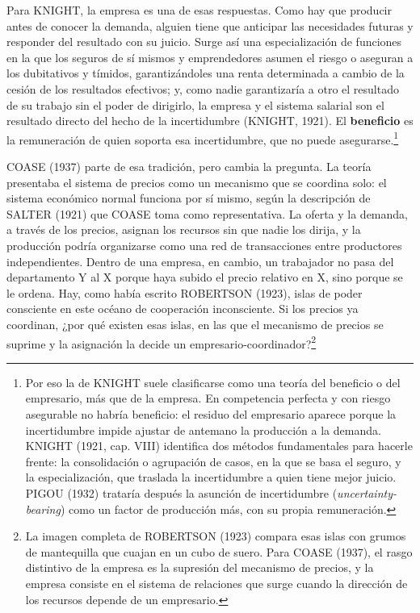 \documentclass[10pt,a4paper]{article}
\begin{document}
Para KNIGHT, la empresa es una de esas respuestas. Como hay que producir antes de conocer la demanda, alguien tiene que anticipar las necesidades futuras y responder del resultado con su juicio. Surge así una especialización de funciones en la que los seguros de sí mismos y emprendedores asumen el riesgo o aseguran a los dubitativos y tímidos, garantizándoles una renta determinada a cambio de la cesión de los resultados efectivos; y, como nadie garantizaría a otro el resultado de su trabajo sin el poder de dirigirlo, la empresa y el sistema salarial son el resultado directo del hecho de la incertidumbre (KNIGHT, 1921). El \textbf{beneficio} es la remuneración de quien soporta esa incertidumbre, que no puede asegurarse.\footnote{%
    Por eso la de KNIGHT suele clasificarse como una teoría del beneficio o del empresario, más que de la empresa. En competencia perfecta y con riesgo asegurable no habría beneficio: el residuo del empresario aparece porque la incertidumbre impide ajustar de antemano la producción a la demanda. KNIGHT (1921, cap. VIII) identifica dos métodos fundamentales para hacerle frente: la consolidación o agrupación de casos, en la que se basa el seguro, y la especialización, que traslada la incertidumbre a quien tiene mejor juicio. PIGOU (1932) trataría después la asunción de incertidumbre (\textit{uncertainty-bearing}) como un factor de producción más, con su propia remuneración.
}

COASE (1937) parte de esa tradición, pero cambia la pregunta. La teoría presentaba el sistema de precios como un mecanismo que se coordina solo: el sistema económico normal funciona por sí mismo, según la descripción de SALTER (1921) que COASE toma como representativa. La oferta y la demanda, a través de los precios, asignan los recursos sin que nadie los dirija, y la producción podría organizarse como una red de transacciones entre productores independientes. Dentro de una empresa, en cambio, un trabajador no pasa del departamento Y al X porque haya subido el precio relativo en X, sino porque se le ordena. Hay, como había escrito ROBERTSON (1923), islas de poder consciente en este océano de cooperación inconsciente. Si los precios ya coordinan, ¿por qué existen esas islas, en las que el mecanismo de precios se suprime y la asignación la decide un empresario-coordinador?\footnote{%
    La imagen completa de ROBERTSON (1923) compara esas islas con grumos de mantequilla que cuajan en un cubo de suero. Para COASE (1937), el rasgo distintivo de la empresa es la supresión del mecanismo de precios, y la empresa consiste en el sistema de relaciones que surge cuando la dirección de los recursos depende de un empresario.
}
\end{document}
